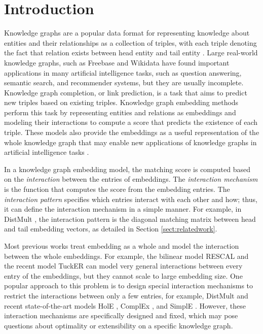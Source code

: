 \documentclass{ecai}
\theoremstyle{plain}  \newtheorem{thm}{Theorem}  \newtheorem{lem}[thm]{Lemma}  \newtheorem{prop}[thm]{Proposition}
\theoremstyle{remark}  \newtheorem*{rem}{Remark}
\begin{document}
\section{Introduction} \label{sect:intro} Knowledge graphs are a popular data format for representing knowledge about entities and their relationships as a collection of triples, with each triple  denoting the fact that relation  exists between head entity  and tail entity . Large real-world knowledge graphs, such as Freebase \cite{bollacker_freebasecollaborativelycreated_2008} and Wikidata \cite{vrandecic_wikidatafreecollaborative_2014} have found important applications in many artificial intelligence tasks, such as question answering, semantic search, and recommender systems, but they are usually incomplete. Knowledge graph completion, or link prediction, is a task that aims to predict new triples based on existing triples. Knowledge graph embedding methods perform this task by representing entities and relations as embeddings and modeling their interactions to compute a score that predicts the existence of each triple. These models also provide the embeddings as a useful representation of the whole knowledge graph that may enable new applications of knowledge graphs in artificial intelligence tasks \cite{tran_exploringscholarlydata_2019}.

In a knowledge graph embedding model, the matching score is computed based on the \textit{interaction} between the entries of embeddings. The \textit{interaction mechanism} is the function that computes the score from the embedding entries. The \textit{interaction pattern} specifies which entries interact with each other and how; thus, it can define the interaction mechanism in a simple manner. For example, in DistMult \cite{yang_embeddingentitiesrelations_2015}, the interaction pattern is the diagonal matching matrix between head and tail embedding vectors, as detailed in Section \ref{sect:relatedwork}.

Most previous works treat embedding as a whole and model the interaction between the whole embeddings. For example, the bilinear model RESCAL \cite{nickel_threewaymodelcollective_2011} and the recent model TuckER \cite{balazevic_tuckertensorfactorization_2019} can model very general interactions between every entry of the embeddings, but they cannot scale to large embedding size. One popular approach to this problem is to design special interaction mechanisms to restrict the interactions between only a few entries, for example, DistMult \cite{yang_embeddingentitiesrelations_2015} and recent state-of-the-art models HolE \cite{nickel_holographicembeddingsknowledge_2016}, ComplEx \cite{trouillon_complexembeddingssimple_2016}, and SimplE \cite{kazemi_simpleembeddinglink_2018,lacroix_canonicaltensordecomposition_2018}. However, these interaction mechanisms are specifically designed and fixed, which may pose questions about optimality or extensibility on a specific knowledge graph. 
\end{document}
